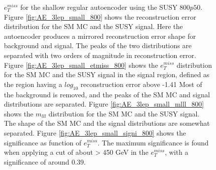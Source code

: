 \begin{figure}[!htb]
{    $e_T^{miss}$ for the shallow regular autoencoder using the SUSY $800p50$. 
    Figure \ref{fig:AE_3lep_small_800} shows the reconstruction error 
    distribution for the SM MC and the SUSY signal. Here the autoencoder produces a mirrored reconstruction error shape for background and 
    signal. The peaks of the two distributions are separated with two orders of magnitude in reconstruction error. Figure \ref{fig:AE_3lep_small_etmiss_800} 
    shows the $e_T^{miss}$ distribution for the SM MC and the SUSY signal in the signal region, defined as the region having a $log_{10}$ reconstruction error above -1.41 Most of the background is removed, and the peaks of the SM MC and signal 
    distributions are separated. Figure \ref{fig:AE_3lep_small_mlll_800} shows the $m_{lll}$ distribution for the SM MC and the SUSY signal. 
    The shape of the SM MC and the signal distributions are somewhat separated. Figure \ref{fig:AE_3lep_small_signi_800} shows the significance as function of
    $e_T^{miss}$. The maximum significance is found when applying a cut of about > 450 GeV in the $e_T^{miss}$, with a significance of around $0.39$.}
    \label{fig:AE_3lep_small_rec_sig_signi_800}
\end{figure}

